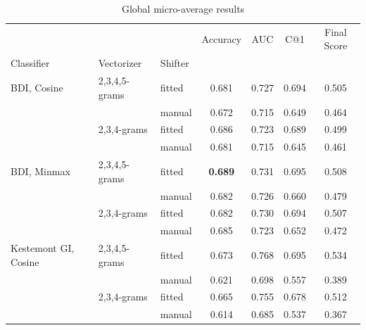 \documentclass[
    hf
]{ceurart}
\begin{document}
\begin{table}
    \caption{Global micro-average results}
    \label{tab:micro}
    \raggedright
    \begin{tabular}{lllcccc}
        \toprule
                                   &               &         & Accuracy       & AUC             & C@1            & Final Score    \\
        Classifier                 & Vectorizer    & Shifter &                &                 &                &                \\
        \midrule
        BDI, Cosine                & 2,3,4,5-grams & fitted  & 0.681          & 0.727           & 0.694          & 0.505          \\
                                   &               & manual  & 0.672          & 0.715           & 0.649          & 0.464          \\
                                   & 2,3,4-grams   & fitted  & 0.686          & 0.723           & 0.689          & 0.499          \\
                                   &               & manual  & 0.681          & 0.715           & 0.645          & 0.461          \\
        BDI, Minmax                & 2,3,4,5-grams & fitted  & \textbf{0.689} & 0.731           & 0.695          & 0.508          \\
                                   &               & manual  & 0.682          & 0.726           & 0.660          & 0.479          \\
                                   & 2,3,4-grams   & fitted  & 0.682          & 0.730           & 0.694          & 0.507          \\
                                   &               & manual  & 0.685          & 0.723           & 0.652          & 0.472          \\
        Kestemont GI, Cosine       & 2,3,4,5-grams & fitted  & 0.673          & 0.768           & 0.695          & 0.534          \\
                                   &               & manual  & 0.621          & 0.698           & 0.557          & 0.389          \\
                                   & 2,3,4-grams   & fitted  & 0.665          & 0.755           & 0.678          & 0.512          \\
                                   &               & manual  & 0.614          & 0.685           & 0.537          & 0.367          \\

\end{tabular}
\end{table}
\end{document}
